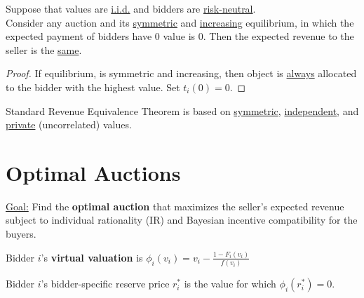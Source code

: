 \documentclass[11pt]{elegantbook}
\begin{document}
\begin{corollary}
    Suppose that values are \underline{i.i.d.} and bidders are \underline{risk-neutral}.\\
    Consider any auction and its \underline{symmetric} and \underline{increasing} equilibrium, in which the expected payment of bidders have $0$ value is $0$. Then the expected revenue to the seller is the \underline{same}.
\end{corollary}
\begin{proof}
    If equilibrium, is symmetric and increasing, then object is \underline{always} allocated to the bidder with the highest value. Set $t_i(0)=0$.
\end{proof}

Standard Revenue Equivalence Theorem is based on \underline{symmetric}, \underline{independent}, and \underline{private} (uncorrelated) values.































\section{Optimal Auctions}
\underline{Goal:} Find the \textbf{optimal auction} that maximizes the seller's expected revenue subject to individual rationality (IR) and Bayesian incentive compatibility for the buyers.


\begin{definition}
    \normalfont
    Bidder $i$'s \textbf{virtual valuation} is $\phi_i(v_i)=v_i-\frac{1-F_i(v_i)}{f(v_i)}$
\end{definition}

\begin{definition}
    \normalfont
    Bidder $i$'s bidder-specific reserve price $r_i^*$ is the value for which $\phi_i(r_i^*)=0$.
\end{definition}
\end{document}
